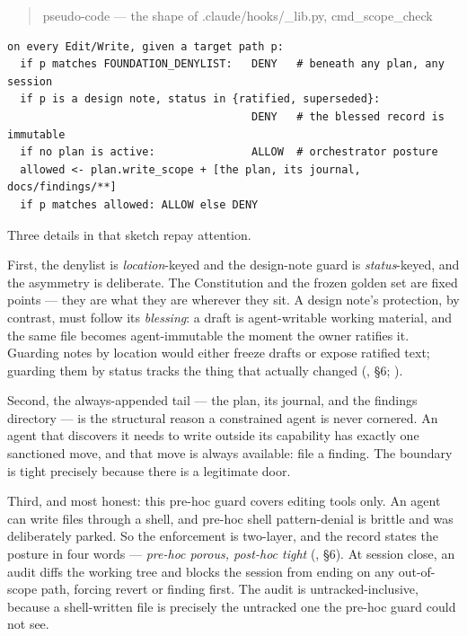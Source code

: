 \begin{quote}\small\ttfamily
pseudo-code --- the shape of .claude/hooks/\_lib.py, cmd\_scope\_check
\end{quote}
{\small\begin{verbatim}
on every Edit/Write, given a target path p:
  if p matches FOUNDATION_DENYLIST:   DENY   # beneath any plan, any session
  if p is a design note, status in {ratified, superseded}:
                                      DENY   # the blessed record is immutable
  if no plan is active:               ALLOW  # orchestrator posture
  allowed <- plan.write_scope + [the plan, its journal, docs/findings/**]
  if p matches allowed: ALLOW else DENY
\end{verbatim}}

\noindent Three details in that sketch repay attention.

First, the denylist is \emph{location}-keyed and the design-note guard is
\emph{status}-keyed, and the asymmetry is deliberate. The Constitution and the
frozen golden set are fixed points --- they are what they are wherever they sit. A
design note's protection, by contrast, must follow its \emph{blessing}: a draft is
agent-writable working material, and the same file becomes agent-immutable the
moment the owner ratifies it. Guarding notes by location would either freeze
drafts or expose ratified text; guarding them by status tracks the thing that
actually changed (, \S 6; ).

Second, the always-appended tail --- the plan, its journal, and the findings
directory --- is the structural reason a constrained agent is never cornered. An
agent that discovers it needs to write outside its capability has exactly one
sanctioned move, and that move is always available: file a finding. The boundary is
tight precisely because there is a legitimate door.

Third, and most honest: this pre-hoc guard covers editing tools only. An agent can
write files through a shell, and pre-hoc shell pattern-denial is brittle and was
deliberately parked. So the enforcement is two-layer, and the record states the
posture in four words --- \emph{pre-hoc porous, post-hoc tight}
(, \S 6). At session close, an audit diffs the working
tree and blocks the session from ending on any out-of-scope path, forcing revert
or finding first. The audit is untracked-inclusive, because a shell-written file is
precisely the untracked one the pre-hoc guard could not see.

